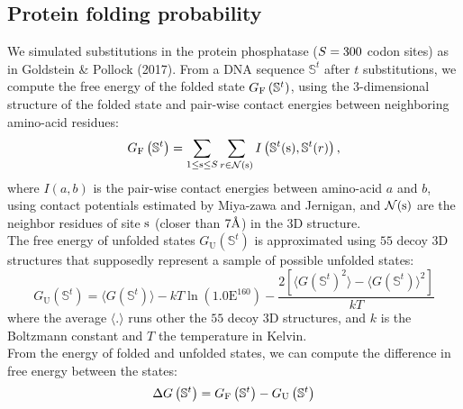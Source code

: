 \subsection{Protein folding probability}
\label{subsec:protein-folding-probability}

We simulated \glspl{substitution} in the protein phosphatase ($S=300$ \gls{codon} sites) as in Goldstein \& Pollock (2017).
From a \acrshort{DNA} sequence $\mathbb{S}^t$ after $t$ \glspl{substitution}, we compute the free energy of the folded state $G_{\mathrm{F}}\left(\mathbb{S}^{t}\right)$, using the $3$-dimensional structure of the folded state and pair-wise contact energies between neighboring amino-acid residues:
\begin{equation}
    G_{\mathrm{F}}\left(\mathbb{S}^{t}\right) = \sum\limits_{1 \leq \text{s} \leq S} \sum\limits_{r \in \mathcal{N}(\text{s})} I \left(\mathbb{S}^t(\text{s}), \mathbb{S}^t(r) \right),
\end{equation}
where $I(a,b)$ is the pair-wise contact energies between amino-acid $a$ and $b$, using contact potentials estimated by Miya-zawa and Jernigan, and $\mathcal{N}(\text{s})$ are the neighbor residues of site $\text{s}$ (closer than $7\text{\normalfont\AA}$) in the $3$D structure.\\

The free energy of unfolded states $G_{\mathrm{U}}\left(\mathbb{S}^{t}\right)$ is approximated using $55$ decoy $3$D structures that supposedly represent a sample of possible unfolded states:
\begin{equation}
    G_{\mathrm{U}}\left(\mathbb{S}^{t}\right) = \langle G\left(\mathbb{S}^{t}\right) \rangle - kT \ln (1.0\mathrm{E}^{160}) - \dfrac{2 \left[ \langle G\left(\mathbb{S}^{t}\right)^2 \rangle - \langle G\left(\mathbb{S}^{t}\right) \rangle^2\right] }{kT}
\end{equation}
where the average $\langle . \rangle$ runs other the $55$ decoy $3$D structures, and $k$ is the Boltzmann constant and $T$ the temperature in Kelvin.\\

From the energy of folded and unfolded states, we can compute the difference in free energy between the states:
\begin{equation}
    \Delta G\left(\mathbb{S}^{t}\right) = G_{\mathrm{F}}\left(\mathbb{S}^{t}\right) - G_{\mathrm{U}}\left(\mathbb{S}^{t}\right)
\end{equation}

